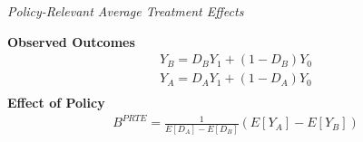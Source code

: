\begin{frame}\begin{center}
		\LARGE\textit{Policy-Relevant Average Treatment Effects}
\end{center}\end{frame}
\begin{frame}
	\textbf{Observed Outcomes}
	\begin{align*}
		Y_B = D_B Y_1 + (1 - D_B) Y_0 \\
		Y_A = D_A Y_1 + (1 - D_A) Y_0 \\
	\end{align*}
	\textbf{Effect of Policy}
	\begin{align*}
		B^{PRTE} = \frac{1}{E[D_A] - E[D_B]} (E[Y_A] - E[Y_B])
	\end{align*}
\end{frame}

